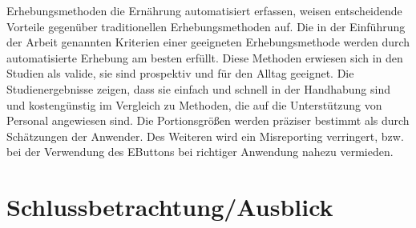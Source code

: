 Erhebungsmethoden die Ernährung automatisiert erfassen, weisen entscheidende Vorteile gegenüber traditionellen Erhebungsmethoden auf. Die in der Einführung der Arbeit genannten Kriterien einer geeigneten Erhebungsmethode werden durch automatisierte Erhebung am besten erfüllt. Diese Methoden erwiesen sich in den Studien als valide, sie sind prospektiv und für den Alltag geeignet. Die Studienergebnisse zeigen, dass sie einfach und schnell in der Handhabung sind und kostengünstig im Vergleich zu Methoden, die auf die Unterstützung von Personal angewiesen sind. Die Portionsgrößen werden präziser bestimmt als durch Schätzungen der Anwender. Des Weiteren wird ein Misreporting verringert, bzw. bei der Verwendung des EButtons bei richtiger Anwendung nahezu vermieden. 


\newpage
\section{Schlussbetrachtung/Ausblick}

